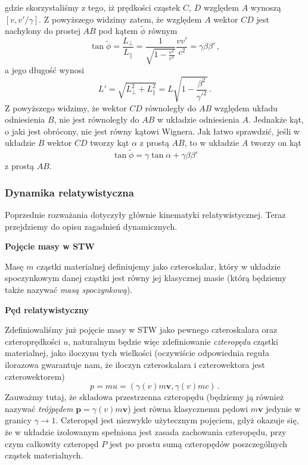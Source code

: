 \documentclass[../main.tex]{subfiles}
\begin{document}
gdzie skorzystaliśmy z tego, iż prędkości cząstek \(C\), \(D\) względem \(A\) wynoszą
\([v,v'/\gamma]\). Z powyższego widzimy zatem, że względem \(A\) wektor \(CD\) jest nachylony do
prostej \(AB\) pod kątem \(\tilde{\phi}\) równym
\begin{equation*}
    \tan\tilde{\phi}=\frac{L_\perp}{L_\parallel}=\frac{1}{\sqrt{1-\frac{v^2}{c^2}}}\frac{vv'}{c^2}=\gamma\beta\beta'\,,
\end{equation*}
a jego długość wynosi
\begin{equation*}
    L'=\sqrt{L_\perp^2+L_\parallel^2}=L\sqrt{1-\frac{\beta^2}{\gamma'^2}}\,.
\end{equation*}
Z powyższego widzimy, że wektor \(CD\) równoległy do \(AB\) względem układu odniesienia \(B\), nie
jest równoległy do \(AB\) w układzie odniesienia \(A\). Jednakże kąt, o jaki jest obrócony, nie jest
równy kątowi Wignera. Jak łatwo sprawdzić, jeśli w układzie \(B\) wektor \(CD\) tworzy kąt
\(\alpha\) z prostą \(AB\), to w układzie \(A\) tworzy on kąt
\begin{equation*}
    \tan\tilde{\phi}=\gamma\tan\alpha+\gamma\beta\beta'
\end{equation*}
z prostą \(AB\).
\subsubsection{Dynamika relatywistyczna}
Poprzednie rozważania dotyczyły głównie kinematyki relatywistycznej. Teraz przejdziemy do opisu
zagadnień dynamicznych.
\medskip

\noindent\textbf{Pojęcie masy w STW}
\medskip

Masę \(m\) cząstki materialnej definiujemy jako czteroskalar, który w układzie spoczynkowym danej
cząstki jest równy jej klasycznej masie (którą będziemy także nazywać \textit{masą spoczynkową}).
\medskip

\noindent\textbf{Pęd relatywistyczny}
\medskip

Zdefiniowaliśmy już pojęcie masy w STW jako pewnego czteroskalara oraz czteroprędkości \(u\),
naturalnym będzie więc zdefiniowanie \textit{czteropędu} cząstki materialnej, jako iloczynu tych
wielkości (oczywiście odpowiednia reguła ilorazowa gwarantuje nam, że iloczyn czteroskalara i
czterowektora jest czterowektorem)
\begin{equation*}
    p=mu=\left(\gamma(v)m\mathbf{v},\gamma(v)mc\right)\,.
\end{equation*}
Zauważmy tutaj, że składowa przestrzenna czteropędu (będziemy ją również nazywać \textit{trójpędem}
\(\mathbf{p}=\gamma(v)m\mathbf{v}\)) jest równa klasycznemu pędowi \(m\mathbf{v}\) jedynie w granicy
\(\gamma\to 1\). Czteropęd jest niezwykle użytecznym pojęciem, gdyż okazuje się, że w układzie
izolowanym spełniona jest zasada zachowania czteropędu, przy czym całkowity czteropęd \(P\) jest po
prostu sumą czteropędów poszczególnych cząstek materialnych.\\
\end{document}
